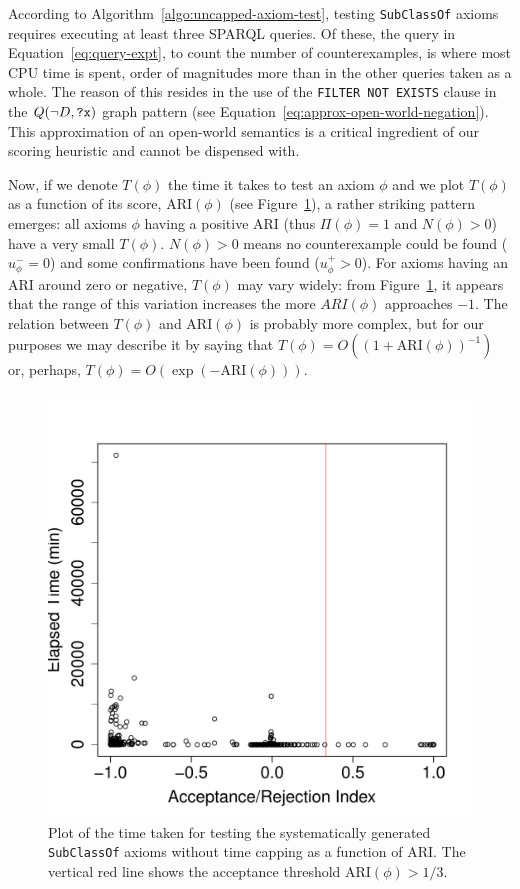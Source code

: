 \documentclass{sig-alternate}
\begin{document}
According to Algorithm~\ref{algo:uncapped-axiom-test}, testing \texttt{SubClassOf} axioms requires executing at least three SPARQL queries.
Of these, the query in Equation~\ref{eq:query-expt}, to count the number of counterexamples,
is where most CPU time is spent, order of magnitudes more than in the other queries taken as a whole.
The reason of this resides in the use of the \texttt{FILTER NOT EXISTS} clause
in the $Q(\neg D, \mbox{\tt ?x})$ graph pattern (see Equation~\ref{eq:approx-open-world-negation}).
This approximation of an open-world semantics is a critical ingredient of our
scoring heuristic and cannot be dispensed with.

Now, if we denote $T(\phi)$ the time it takes to test an axiom $\phi$ and we plot
$T(\phi)$ as a function of its score, $\mathrm{ARI}(\phi)$ (see Figure~\ref{fig:time-ARI}),
a rather striking pattern emerges: all axioms $\phi$ having a positive ARI
(thus $\Pi(\phi) = 1$ and $N(\phi) > 0$) have a very small $T(\phi)$.
$N(\phi) > 0$ means no counterexample could be found ($u^-_\phi = 0$)
and some confirmations have been found ($u^+_\phi > 0$).
For axioms having an ARI around zero or negative, $T(\phi)$ may vary widely:
from Figure~\ref{fig:time-ARI}, it appears that the range of this variation
increases the more $ARI(\phi)$ approaches $-1$.
The relation between $T(\phi)$ and $\mathrm{ARI}(\phi)$ is probably more complex,
but for our purposes we may describe it by saying that
$T(\phi) = O\left((1 + \mathrm{ARI}(\phi))^{-1}\right)$ or, perhaps,
$T(\phi) = O\left(\exp(-\mathrm{ARI}(\phi))\right)$.
\begin{figure}[t]
\begin{center}
  \includegraphics[height=\plotheight]{time-ARI}
\end{center}
\caption{Plot of the time taken for testing the systematically generated
  \texttt{SubClassOf} axioms without time capping as a function of ARI.
  The vertical red line shows the acceptance threshold $\mathrm{ARI}(\phi)>1/3$.}
\label{fig:time-ARI}
\end{figure}
\end{document}
